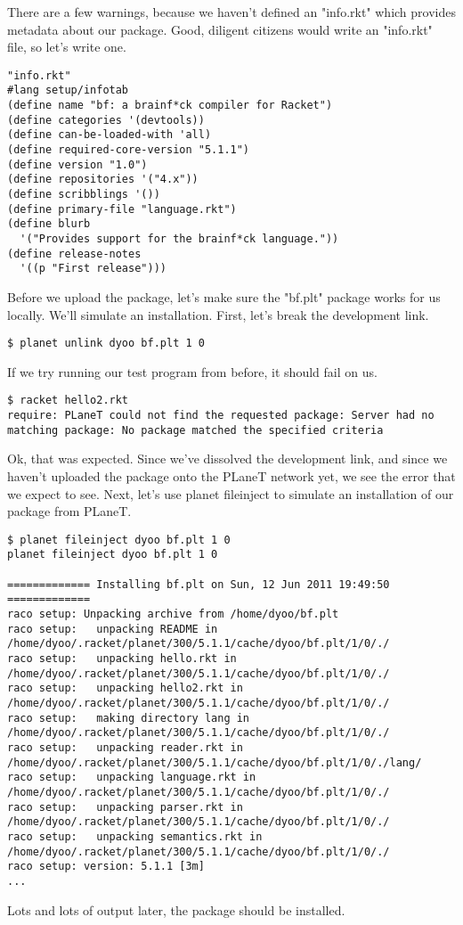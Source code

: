 \documentclass{article}
\begin{document}
There are a few warnings, because we haven’t defined an "info.rkt" which provides metadata about our package. Good, diligent citizens would write an "info.rkt" file, so let’s write one.
\begin{verbatim}
"info.rkt"
#lang setup/infotab
(define name "bf: a brainf*ck compiler for Racket")
(define categories '(devtools))
(define can-be-loaded-with 'all)
(define required-core-version "5.1.1")
(define version "1.0")
(define repositories '("4.x"))
(define scribblings '())
(define primary-file "language.rkt")
(define blurb
  '("Provides support for the brainf*ck language."))
(define release-notes
  '((p "First release")))
\end{verbatim}
Before we upload the package, let’s make sure the "bf.plt" package works for us locally. We’ll simulate an installation. First, let’s break the development link.
\begin{verbatim}
$ planet unlink dyoo bf.plt 1 0
\end{verbatim}
If we try running our test program from before, it should fail on us.
\begin{verbatim}
$ racket hello2.rkt
require: PLaneT could not find the requested package: Server had no matching package: No package matched the specified criteria
\end{verbatim}
Ok, that was expected. Since we’ve dissolved the development link, and since we haven’t uploaded the package onto the PLaneT network yet, we see the error that we expect to see.
Next, let’s use planet fileinject to simulate an installation of our package from PLaneT.
\begin{verbatim}
$ planet fileinject dyoo bf.plt 1 0
planet fileinject dyoo bf.plt 1 0
 
============= Installing bf.plt on Sun, 12 Jun 2011 19:49:50 =============
raco setup: Unpacking archive from /home/dyoo/bf.plt
raco setup:   unpacking README in /home/dyoo/.racket/planet/300/5.1.1/cache/dyoo/bf.plt/1/0/./
raco setup:   unpacking hello.rkt in /home/dyoo/.racket/planet/300/5.1.1/cache/dyoo/bf.plt/1/0/./
raco setup:   unpacking hello2.rkt in /home/dyoo/.racket/planet/300/5.1.1/cache/dyoo/bf.plt/1/0/./
raco setup:   making directory lang in /home/dyoo/.racket/planet/300/5.1.1/cache/dyoo/bf.plt/1/0/./
raco setup:   unpacking reader.rkt in /home/dyoo/.racket/planet/300/5.1.1/cache/dyoo/bf.plt/1/0/./lang/
raco setup:   unpacking language.rkt in /home/dyoo/.racket/planet/300/5.1.1/cache/dyoo/bf.plt/1/0/./
raco setup:   unpacking parser.rkt in /home/dyoo/.racket/planet/300/5.1.1/cache/dyoo/bf.plt/1/0/./
raco setup:   unpacking semantics.rkt in /home/dyoo/.racket/planet/300/5.1.1/cache/dyoo/bf.plt/1/0/./
raco setup: version: 5.1.1 [3m]
...
\end{verbatim}
Lots and lots of output later, the package should be installed.
\end{document}
